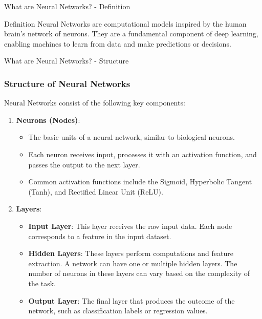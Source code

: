 \documentclass[aspectratio=169]{beamer}
\begin{document}
\begin{frame}[fragile]{What are Neural Networks? - Definition}
    \begin{block}{Definition}
        Neural Networks are computational models inspired by the human brain's network of neurons. They are a fundamental component of deep learning, enabling machines to learn from data and make predictions or decisions.
    \end{block}
\end{frame}

\begin{frame}[fragile]{What are Neural Networks? - Structure}
    \frametitle{Structure of Neural Networks}

    Neural Networks consist of the following key components:
    \begin{enumerate}
        \item \textbf{Neurons (Nodes)}:
            \begin{itemize}
                \item The basic units of a neural network, similar to biological neurons.
                \item Each neuron receives input, processes it with an activation function, and passes the output to the next layer.
                \item Common activation functions include the Sigmoid, Hyperbolic Tangent (Tanh), and Rectified Linear Unit (ReLU).
            \end{itemize}
        \item \textbf{Layers}:
            \begin{itemize}
                \item \textbf{Input Layer}: This layer receives the raw input data. Each node corresponds to a feature in the input dataset.
                \item \textbf{Hidden Layers}: These layers perform computations and feature extraction. A network can have one or multiple hidden layers. The number of neurons in these layers can vary based on the complexity of the task.
                \item \textbf{Output Layer}: The final layer that produces the outcome of the network, such as classification labels or regression values.
            \end{itemize}
    \end{enumerate}
\end{frame}
\end{document}
